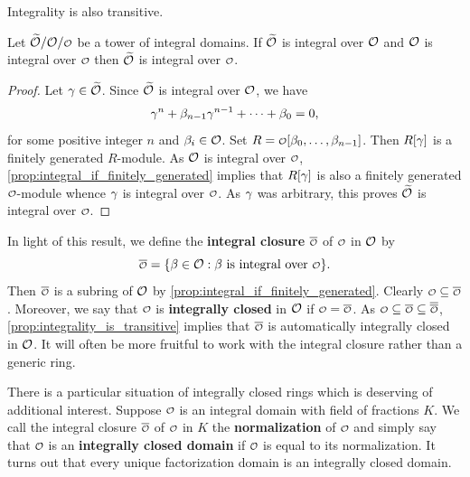     Integrality is also transitive.

    \begin{proposition}\label{prop:integrality_is_transitive}
      Let \(\wtilde{\mc{O}}/\mc{O}/\smc{O}\) be a tower of integral domains. If \(\widetilde{\mathcal{O}}\) is integral over \(\mathcal{O}\) and \(\mathcal{O}\) is integral over \(\smc{O}\) then \(\widetilde{\mathcal{O}}\) is integral over \(\smc{O}\).
    \end{proposition}
    \begin{proof}
      Let \(\gamma \in \widetilde{\mathcal{O}}\). Since \(\widetilde{\mathcal{O}}\) is integral over \(\mathcal{O}\), we have
      \[
        \gamma^{n}+\beta_{n-1}\gamma^{n-1}+\cdots+\beta_{0} = 0,
      \]
      for some positive integer \(n\) and \(\beta_{i} \in \mathcal{O}\). Set \(R = \smc{O}[\b_{0},\ldots,\b_{n-1}]\). Then \(R[\gamma]\) is a finitely generated \(R\)-module. As \(\mathcal{O}\) is integral over \(\smc{O}\), \cref{prop:integral_if_finitely_generated} implies that \(R[\gamma]\) is also a finitely generated \(\smc{O}\)-module whence \(\gamma\) is integral over \(\smc{O}\). As \(\gamma\) was arbitrary, this proves \(\widetilde{\mathcal{O}}\) is integral over \(\smc{O}\).
    \end{proof}

    In light of this result, we define the \textbf{integral closure} \(\conj{\smc{O}}\) of \(\smc{O}\) in \(\mathcal{O}\) by
    \[
      \conj{\smc{O}} = \{\b \in \mc{O}:\b \text{ is integral over } \smc{O}\}.
    \]
    Then \(\conj{\smc{O}}\) is a subring of \(\mathcal{O}\) by \cref{prop:integral_if_finitely_generated}. Clearly \(\smc{O} \subseteq \conj{\smc{O}}\). Moreover, we say that \(\smc{O}\) is \textbf{integrally closed} in \(\mathcal{O}\) if \(\smc{O} = \conj{\smc{O}}\). As \(\smc{O} \subseteq \conj{\smc{O}} \subseteq \conj{\conj{\smc{O}}}\), \cref{prop:integrality_is_transitive} implies that \(\conj{\smc{O}}\) is automatically integrally closed in \(\mathcal{O}\). It will often be more fruitful to work with the integral closure rather than a generic ring.
    
    There is a particular situation of integrally closed rings which is deserving of additional interest. Suppose \(\smc{O}\) is an integral domain with field of fractions \(K\). We call the integral closure \(\conj{\smc{O}}\) of \(\smc{O}\) in \(K\) the \textbf{normalization} of \(\smc{O}\) and simply say that \(\smc{O}\) is an \textbf{integrally closed domain} if \(\smc{O}\) is equal to its normalization. It turns out that every unique factorization domain is an integrally closed domain.

